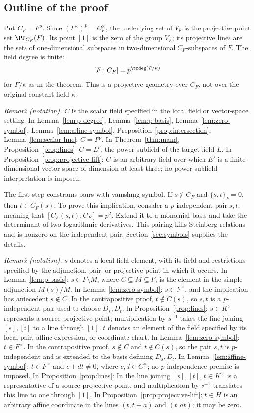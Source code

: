 \subsection{Outline of the proof}

Put $C_F=F^p$. Since $(F^\times)^p=C_F^\times$, the underlying
set of $V_F$ is the projective point set $\PP_{C_F}(F)$.
Its point $[1]$ is the zero of the group $V_F$; its projective lines
are the sets of one-dimensional subspaces in two-dimensional
$C_F$-subspaces of $F$. The field degree is finite:
\[
                         [F:C_F]=p^{\trdeg(F/\kappa)}
\]
for $F/\kappa$ as in the theorem. This is a projective geometry over
$C_F$, not over the original constant field $\kappa$.

\noindent\textit{Remark (notation).} $C$ is the scalar field specified in the local field or vector-space setting. In Lemma~\ref{lem:p-degree}, Lemma~\ref{lem:p-basis}, Lemma~\ref{lem:zero-symbol}, Lemma~\ref{lem:affine-symbol}, Proposition~\ref{prop:intersection}, Lemma~\ref{lem:scalar-line}: $C=F^p$. In Theorem~\ref{thm:main}, Proposition~\ref{prop:lines}: $C=L^p$, the power subfield of the target field $L$. In Proposition~\ref{prop:projective-lift}: $C$ is an arbitrary field over which $E'$ is a finite-dimensional vector space of dimension at least three; no power-subfield interpretation is imposed.


The first step constrains pairs with vanishing symbol.
If $s\notin C_F$ and $\{s,t\}_F=0$, then $t\in C_F(s)$.
To prove this implication, consider a $p$-independent pair $s,t$, meaning
that $[C_F(s,t):C_F]=p^2$. Extend it to a monomial basis and take the
determinant of two logarithmic derivatives. This
pairing kills Steinberg relations and is nonzero on the independent
pair. Section~\ref{sec:symbols} supplies the details.

\noindent\textit{Remark (notation).} $s$ denotes a local field element, with its field and restrictions specified by the adjunction, pair, or projective point in which it occurs. In Lemma~\ref{lem:p-basis}: $s\in F\setminus M$, where $C\subseteq M\subseteq F$, is the element in the simple adjunction $M(s)/M$. In Lemma~\ref{lem:zero-symbol}: $s\in F^\times$, and the implication has antecedent $s\notin C$. In the contrapositive proof, $t\notin C(s)$, so $s,t$ is a $p$-independent pair used to choose $D_s,D_t$. In Proposition~\ref{prop:lines}: $s\in K^\times$ represents a source projective point; multiplication by $s^{-1}$ takes the line joining $[s],[t]$ to a line through $[1]$. $t$ denotes an element of the field specified by its local pair, affine expression, or coordinate chart. In Lemma~\ref{lem:zero-symbol}: $t\in F^\times$. In the contrapositive proof, $s\notin C$ and $t\notin C(s)$, so the pair $s,t$ is $p$-independent and is extended to the basis defining $D_s,D_t$. In Lemma~\ref{lem:affine-symbol}: $t\in F^\times$ and $c+dt\ne0$, where $c,d\in C^\times$; no $p$-independence premise is imposed. In Proposition~\ref{prop:lines}: In the line joining $[s],[t]$, $t\in K^\times$ is a representative of a source projective point, and multiplication by $s^{-1}$ translates this line to one through $[1]$. In Proposition~\ref{prop:projective-lift}: $t\in H$ is an arbitrary affine coordinate in the lines $(t,t+a)$ and $(t,at)$; it may be zero.


